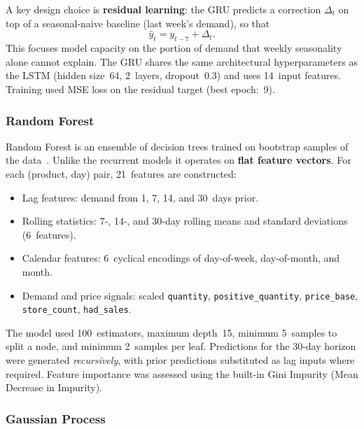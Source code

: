 \documentclass[12pt, a4paper]{article}
\begin{document}
A key design choice is \textbf{residual learning}: the GRU predicts a correction
$\Delta_t$ on top of a seasonal-naive baseline (last week's demand), so that
\begin{equation}
    \hat{y}_t = y_{t-7} + \Delta_t.
    \label{eq:residual}
\end{equation}
This focuses model capacity on the portion of demand that weekly seasonality alone cannot
explain. The GRU shares the same architectural hyperparameters as the LSTM
(hidden size~64, 2~layers, dropout~0.3) and uses 14~input features. Training used MSE loss
on the residual target (best epoch:~9).

\subsubsection{Random Forest}
\label{ssubsec:rf}

Random Forest is an ensemble of decision trees trained on bootstrap samples of the
data~\cite{breiman2001}. Unlike the recurrent models it operates on \textbf{flat feature
vectors}. For each (product, day) pair, 21~features are constructed:
\begin{itemize}[leftmargin=*, nosep]
    \item Lag features: demand from 1, 7, 14, and 30~days prior.
    \item Rolling statistics: 7-, 14-, and 30-day rolling means and standard deviations
          (6~features).
    \item Calendar features: 6~cyclical encodings of day-of-week, day-of-month, and month.
    \item Demand and price signals: scaled \texttt{quantity}, \texttt{positive\_quantity},
          \texttt{price\_base}, \texttt{store\_count}, \texttt{had\_sales}.
\end{itemize}
The model used 100~estimators, maximum depth~15, minimum 5~samples to split a node, and
minimum 2~samples per leaf. Predictions for the 30-day horizon were generated
\emph{recursively}, with prior predictions substituted as lag inputs where required.
Feature importance was assessed using the built-in Gini Impurity (Mean Decrease in
Impurity).

\subsubsection{Gaussian Process}
\label{ssubsec:gp}
\end{document}

